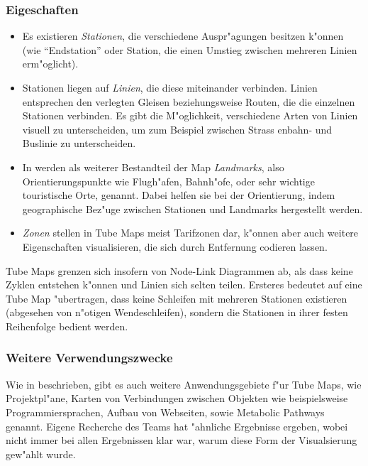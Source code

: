 \subsubsection{Eigeschaften}
\begin{itemize}
\item Es existieren \emph{Stationen}, die verschiedene Auspr"agungen besitzen k"onnen (wie "`Endstation"' oder Station, die einen Umstieg zwischen mehreren Linien erm"oglicht). 
\item Stationen liegen auf \emph{Linien}, die diese miteinander verbinden. Linien entsprechen den verlegten Gleisen beziehungsweise Routen, die die einzelnen Stationen verbinden. Es gibt die M"oglichkeit, verschiedene Arten von Linien visuell zu unterscheiden, um zum Beispiel zwischen Strass enbahn- und Buslinie zu unterscheiden.
\item In \cite{automaticlayoutmetro08} werden als weiterer Bestandteil der Map \emph{Landmarks}, also Orientierungspunkte wie Flugh"afen, Bahnh"ofe, oder sehr wichtige touristische Orte, genannt. Dabei helfen sie bei der Orientierung, indem geographische Bez"uge zwischen Stationen und Landmarks hergestellt werden.
\item \emph{Zonen} stellen in Tube Maps meist Tarifzonen dar, k"onnen aber auch weitere Eigenschaften visualisieren, die sich durch Entfernung codieren lassen. 
\end{itemize}
Tube Maps grenzen sich insofern von Node-Link Diagrammen ab, als dass keine Zyklen entstehen k"onnen und Linien sich selten teilen. Ersteres bedeutet auf eine Tube Map "ubertragen, dass keine Schleifen mit mehreren Stationen existieren (abgesehen von n"otigen Wendeschleifen), sondern die Stationen in ihrer festen Reihenfolge bedient werden. 

\subsubsection{Weitere Verwendungszwecke}
\label{tm:verwendungszwecke}
Wie in \cite{automaticlayoutmetro08} beschrieben, gibt es auch weitere Anwendungsgebiete f"ur Tube Maps, wie Projektpl"ane, Karten von Verbindungen zwischen Objekten wie beispielsweise Programmiersprachen, Aufbau von Webseiten, sowie Metabolic Pathways genannt. Eigene Recherche des Teams hat "ahnliche Ergebnisse ergeben, wobei nicht immer bei allen Ergebnissen klar war, warum diese Form der Visualsierung gew"ahlt wurde. 

